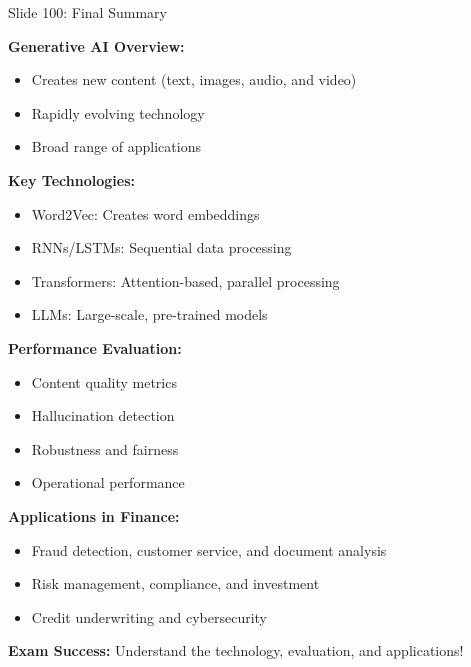 \documentclass[8pt]{beamer}
\begin{document}
\begin{frame}{Slide 100: Final Summary}
	\fontsize{6.5}{7.5}\selectfont
	
	\textbf{\textcolor{myblue}{Generative AI Overview:}}
	\begin{itemize}
		\item Creates new content (text, images, audio, and video)
		\item Rapidly evolving technology
		\item Broad range of applications
	\end{itemize}
	
	\vspace{0.1cm}
	\textbf{\textcolor{myblue}{Key Technologies:}}
	\begin{itemize}
		\item Word2Vec: Creates word embeddings
		\item RNNs/LSTMs: Sequential data processing
		\item Transformers: Attention-based, parallel processing
		\item LLMs: Large-scale, pre-trained models
	\end{itemize}
	
	\vspace{0.1cm}
	\textbf{\textcolor{myblue}{Performance Evaluation:}}
	\begin{itemize}
		\item Content quality metrics
		\item Hallucination detection
		\item Robustness and fairness
		\item Operational performance
	\end{itemize}
	
	\vspace{0.1cm}
	\textbf{\textcolor{myblue}{Applications in Finance:}}
	\begin{itemize}
		\item Fraud detection, customer service, and document analysis
		\item Risk management, compliance, and investment
		\item Credit underwriting and cybersecurity
	\end{itemize}
	
	\textcolor{myred}{\textbf{Exam Success:}}
	Understand the technology, evaluation, and applications!
\end{frame}


	
\end{document}
